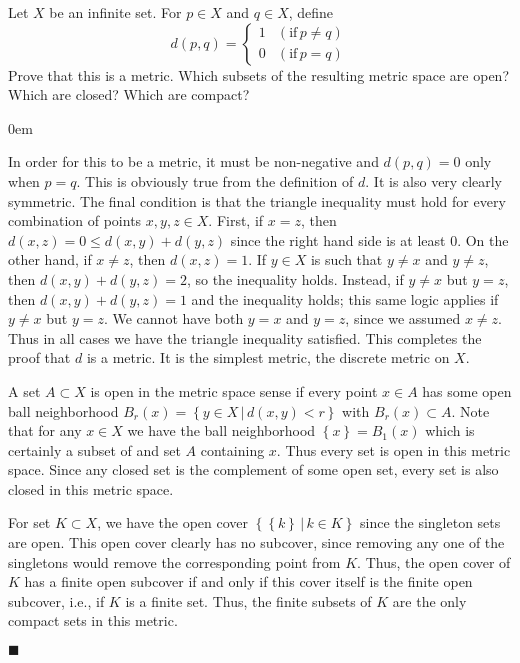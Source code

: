\documentclass[12pt]{article}
\renewcommand{\qed}{\hfill$\blacksquare$}
\renewenvironment{proof}{\begin{addmargin}[1em]{0em}\begin{newproof}}{\end{newproof}\end{addmargin}\qed}
\newenvironment{problem}[2][Exercise]{\begin{trivlist}
\item[\hskip \labelsep {\bfseries #1}\hskip \labelsep {\bfseries #2.}]}{\end{trivlist}}
\begin{document}
\begin{problem}{2.10}
Let $X$ be an infinite set. For $p\in X$ and $q\in X$, define
\begin{equation*}
 d\left(p,q\right) = \left\{ \begin{array}{lr} 1 & \left(\text{if}\, p\neq q\right) \\ 0 & \left(\text{if}\, p=q\right) \end{array} \right.
\end{equation*}
Prove that this is a metric. Which subsets of the resulting metric space are open? Which are closed? Which are compact?
\end{problem}

\begin{proof}
In order for this to be a metric, it must be non-negative and $d\left(p,q\right) = 0$ only when $p=q$. This is obviously true from the definition of $d$. It is also very clearly symmetric. The final condition is that the triangle inequality must hold for every combination of points $x,y,z \in X$. First, if $x=z$, then $d\left(x,z\right) =0 \leq d\left(x,y\right) + d\left(y,z\right)$ since the right hand side is at least $0$. On the other hand, if $x\neq z$, then $d\left(x,z\right)=1$. If $y\in X$ is such that $y\neq x$ and $y\neq z$, then $d\left(x,y\right) + d\left(y,z\right) = 2$, so the inequality holds. Instead, if $y\neq x$ but $y=z$, then $d\left(x,y\right) + d\left(y,z\right) = 1$ and the inequality holds; this same logic applies if $y\neq x$ but $y=z$. We cannot have both $y=x$ and $y=z$, since we assumed $x\neq z$. Thus in all cases we have the triangle inequality satisfied. This completes the proof that $d$ is a metric. {\color{red}It is the simplest metric, the discrete metric on $X$.}

A set $A\subset X$ is open {\color{red}in the metric space sense} if every point $x\in A$ has some open ball neighborhood $B_r\left(x\right) = \left\{ y\in X\,|\, d\left(x,y\right)<r\right\}$ with $B_r\left(x\right) \subset A$. Note that for any $x\in X$ we have the ball neighborhood $\left\{x\right\} = B_1\left(x\right)$ which is certainly a subset of and set $A$ containing $x$. Thus every set is open in this metric space. Since any closed set is the complement of some open set, every set is also closed in this metric space.

For set $K \subset X$, we have the open cover $\left\{ \left\{k\right\}\, | \, k \in K\right\}$ since the singleton sets are open. This open cover clearly has {\color{red}no subcover}, since removing any one of the singletons would remove the corresponding point from $K$. Thus, the open cover of $K$ has a finite open subcover if and only if this cover itself is the finite open subcover, i.e., if $K$ is a finite set. Thus, the finite subsets of $K$ are the only compact sets in this metric.
\end{proof}
\end{document}
